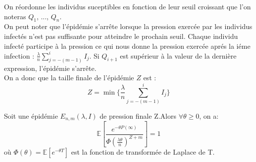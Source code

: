 On réordonne les individus suceptibles en fonction de leur seuil croissant que l'on noteras $Q_1$, ..., $Q_n$. \\
On peut noter que l'épidémie s'arrête lorsque la pression exercée par les individus infectés n'est pas suffisante pour atteindre le prochain seuil. Chaque individu infecté participe à la pression ce qui nous donne la pression exercée aprés la iéme infection : $ \frac{\lambda}{n} \sum^i_{j = - (m-1)} I_j $. Si $Q_{i+1}$ est supérieur à la valeur de la dernière expression, l'épidémie s'arrête.\\
On a donc que la taille finale de l'épidémie $Z$ est :
$$ Z = \min \{\frac{\lambda}{n} \sum^i_{j = - (m-1)} I_j \} $$

\begin{theorem}
Soit une épidémie $E_{n,m}(\lambda, I)$ de pression finale Z.Alors $ \forall \theta \geq 0$, on a:\\

$$\mathbb{E}[ \frac{ e^{-\theta P(\infty)} }{ \Phi( \frac{\lambda \theta}{n})^{Z + m} } ] = 1 $$
où $ \Phi(\theta) = \mathbb{E}[e^{-\theta T}] $ est la fonction de transformée de Laplace de T.
\end{theorem}

